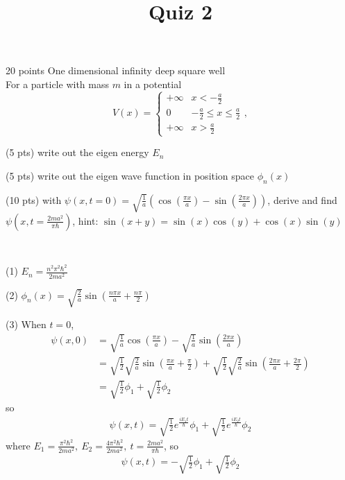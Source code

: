 \documentclass[UTF8,12pt]{article} %
\makeatletter
\newenvironment{proof}[1][\protect\proofname]{\par
\normalfont\topsep6\p@\@plus6\p@\relax
\trivlist
\itemindent\parindent
\item[\hskip\labelsep
\scshape
#1]\ignorespaces
}{%
\endtrivlist\@endpefalse
}
\renewcommand{\proofname}{\it{Solution}}
\makeatother
\begin{document}
\title{Quiz 2}
\date{} %
\maketitle

\begin{exercise}{20 points}{}
One dimensional infinity deep square well\\
For a particle with mass $m$ in a potential 
$$V(x) = \begin{cases}+\infty & x<-\frac{a}{2 }\\ 0 & -\frac{a}{2}\le x\le \frac{a}{2} \\ +\infty & x>\frac{a}{2}\end{cases},$$
\begin{enumerate*}
\item (5 pts) write out the eigen energy $E_{n}$
\item (5 pts) write out the eigen wave function in position space $\phi_{n}(x)$
\item (10 pts) with $\psi(x,t=0) = \sqrt{\frac{1}{a}}\left(\cos\left(\frac{\pi x}{a}\right) - \sin\left(\frac{2\pi x}{a}\right)\right)$, derive and find $\psi(x, t = \frac{2ma^{2}}{\pi \hbar})$, hint: $\sin(x+y) = \sin(x)\cos(y) + \cos(x)\sin(y)$
\end{enumerate*}
\end{exercise}

\begin{proof}[Solution]~\par
(1) $E_{n} = \frac{n^{2}\pi^{2}\hbar^{2}}{2ma^{2}}$\par
(2) $\phi_{n}(x) = \sqrt{\frac{2}{a}}\sin\left(\frac{n\pi x}{a} + \frac{n\pi}{2}\right)$\par
(3) When $t = 0$,
\begin{align}
\psi(x,0) &= \sqrt{\frac{1}{a}}\cos\left(\frac{\pi x}{a}\right) - \sqrt{\frac{1}{a}}\sin\left(\frac{2\pi x}{a}\right) \\
&= \sqrt{\frac{1}{2}}\sqrt{\frac{2}{a}}\sin\left(\frac{\pi x}{a} + \frac{\pi}{2}\right) + \sqrt{\frac{1}{2}}\sqrt{\frac{2}{a}}\sin\left(\frac{2\pi x}{a} + \frac{2\pi}{2}\right) \\
&= \sqrt{\frac{1}{2}}\phi_{1} + \sqrt{\frac{1}{2}}\phi_{2}
\end{align}
so
\begin{align}
\psi(x,t) = \sqrt{\frac{1}{2}}e^{\frac{iE_{1}t}{\hbar}}\phi_{1} + \sqrt{\frac{1}{2}}e^{\frac{iE_{2}t}{\hbar}}\phi_{2}
\end{align}
where $E_{1} = \frac{\pi^{2}\hbar^{2}}{2ma^{2}},~ E_{2} = \frac{4\pi^{2}\hbar^{2}}{2ma^{2}},~ t = \frac{2ma^{2}}{\pi\hbar}$, so
\begin{align}
\psi(x,t) = -\sqrt{\frac{1}{2}}\phi_{1} + \sqrt{\frac{1}{2}}\phi_{2}
\end{align}
\end{proof}
\end{document}
